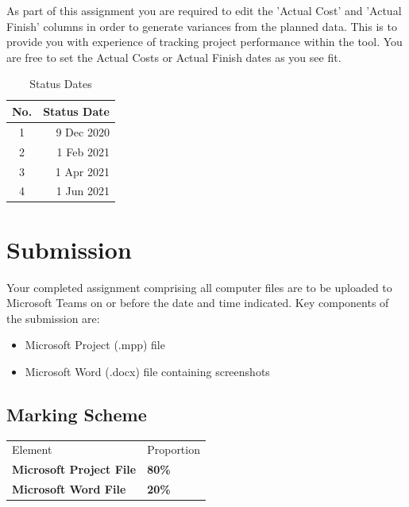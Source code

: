 As part of this assignment you are required to edit the 'Actual Cost' and 'Actual Finish' columns in order to generate variances from the planned data.  This is to provide you with experience of tracking project performance within the tool.  You are free to set the Actual Costs or Actual Finish dates as you see fit. 

\begin{table}
	\centering

	\begin{tabular}{ |c|r| }
		\hline
		\textbf{No.} & \textbf{Status Date} \\
		\hline 
		1 &  9 Dec 2020\\ 
		2 &  1 Feb 2021 \\ 
		3 &  1 Apr 2021\\ 
		4 &  1 Jun 2021 \\
		\hline
	\end{tabular}
	\caption{Status Dates}	
	\label{tab:StatusDates}
\end{table}


\section*{Submission}
Your completed assignment comprising all computer files are to be uploaded to Microsoft Teams on or before the date and time indicated.  Key components of the submission are:
\begin{itemize}
	\item Microsoft Project (.mpp) file
	\item Microsoft Word (.docx) file containing screenshots
\end{itemize}



\subsection*{Marking Scheme}

\begin{table}[h!]
     \begin{center}
     \begin{tabular}{p{5cm}  p{5cm} }
     \toprule
      \textbf\large{Element} & \textbf\large{Proportion} \\ 
    \cmidrule(r){1-1}\cmidrule(lr){2-2}
      \textbf{Microsoft Project File} & \textbf{80\%}\\
      \textbf{Microsoft Word File} & \textbf{20\%}
      
      \\ \bottomrule
      \end{tabular}
      \label{tbl:markSchemeAsmt3}
      \end{center}
 \end{table}

